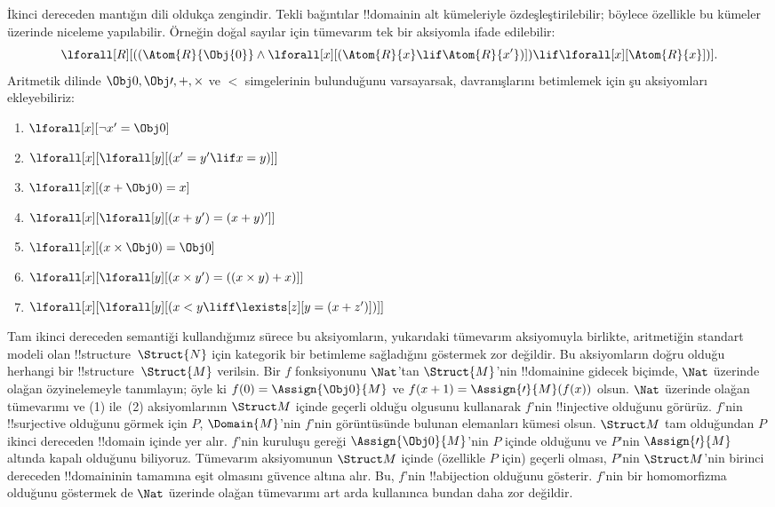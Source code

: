 İkinci dereceden mantığın dili oldukça zengindir. Tekli bağıntılar !!{domain}{}in
alt kümeleriyle özdeşleştirilebilir; böylece özellikle bu kümeler üzerinde
niceleme yapılabilir. Örneğin doğal sayılar için tümevarım tek bir aksiyomla
ifade edilebilir:
\[
\lforall[R][((\Atom{R}{\Obj{0}} \land \lforall[x][(\Atom{R}{x} \lif
    \Atom{R}{x'})]) \lif \lforall[x][\Atom{R}{x}])].
\]
Aritmetik dilinde $\Obj 0, \Obj \prime, +, \times$ ve $<$ simgelerinin
bulunduğunu varsayarsak, davranışlarını betimlemek için şu aksiyomları
ekleyebiliriz:
\begin{enumerate}
\item $\lforall[x][\lnot x' = \Obj 0]$
\item $\lforall[x][\lforall[y][(x' = y' \lif x = y)]]$
\item $\lforall[x][(x + \Obj 0) = x]$
\item $\lforall[x][\lforall[y][(x + y') = (x + y)']]$
\item $\lforall[x][(x \times \Obj 0) = \Obj 0]$
\item $\lforall[x][\lforall[y][(x \times y') = ((x \times y) + x)]]$
\item $\lforall[x][\lforall[y][(x < y \liff \lexists[z][y = (x + z')])]]$
\end{enumerate}
Tam ikinci dereceden semantiği kullandığımız sürece bu aksiyomların, yukarıdaki
tümevarım aksiyomuyla birlikte, aritmetiğin standart modeli olan
!!{structure}~$\Struct{N}$ için kategorik bir betimleme sağladığını göstermek
zor değildir. Bu aksiyomların doğru olduğu herhangi bir
!!{structure}~$\Struct{M}$ verilsin. Bir $f$ fonksiyonunu $\Nat$'tan
$\Struct{M}$'nin !!{domain}{}ine gidecek biçimde, $\Nat$ üzerinde olağan
özyinelemeyle tanımlayın; öyle ki $f(0) = \Assign{\Obj 0}{M}$ ve
$f(x+1) = \Assign{\prime}{M}(f(x))$ olsun. $\Nat$ üzerinde olağan tümevarımı ve
(1) ile~(2) aksiyomlarının
$\Struct M$ içinde geçerli olduğu olgusunu kullanarak $f$'nin !!{injective}
olduğunu görürüz. $f$'nin !!{surjective} olduğunu görmek için $P$,
$\Domain{M}$'nin $f$'nin görüntüsünde bulunan elemanları kümesi olsun.
$\Struct M$ tam olduğundan $P$ ikinci dereceden !!{domain} içinde yer alır.
$f$'nin kuruluşu
gereği $\Assign{\Obj 0}{M}$'nin $P$ içinde olduğunu ve $P$'nin
$\Assign{\prime}{M}$ altında kapalı olduğunu biliyoruz. Tümevarım aksiyomunun
$\Struct M$ içinde (özellikle $P$ için) geçerli olması, $P$'nin $\Struct M$'nin
birinci dereceden !!{domain}{}inin tamamına eşit olmasını güvence altına alır.
Bu, $f$'nin !!a{bijection} olduğunu gösterir. $f$'nin bir homomorfizma olduğunu
göstermek de $\Nat$ üzerinde olağan tümevarımı art arda kullanınca bundan daha
zor değildir.

